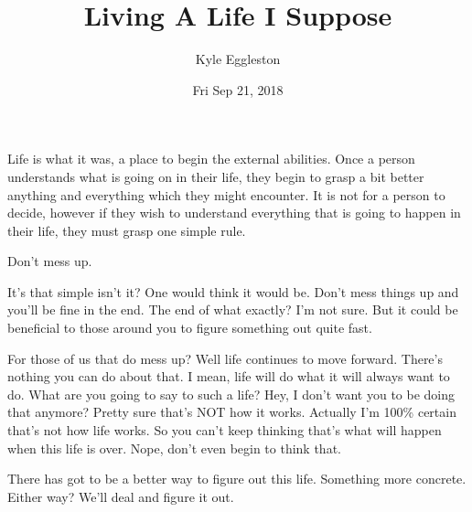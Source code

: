 \documentclass{article}
\title{Living A Life I Suppose}
\author{Kyle Eggleston}
\date{Fri Sep 21, 2018}
\begin{document}
\maketitle

Life is what it was, a place to begin the external abilities. Once a person understands what is going on in their life, they begin to grasp a bit better anything and everything which they might encounter. It is not for a person to decide, however if they wish to understand everything that is going to happen in their life, they must grasp one simple rule.

Don't mess up.

It's that simple isn't it? One would think it would be. Don't mess things up and you'll be fine in the end. The end of what exactly? I'm not sure. But it could be beneficial to those around you to figure something out quite fast.

For those of us that do mess up? Well life continues to move forward. There's nothing you can do about that. I mean, life will do what it will always want to do. What are you going to say to such a life? Hey, I don't want you to be doing that anymore? Pretty sure that's NOT how it works. Actually I'm 100\% certain that's not how life works. So you can't keep thinking that's what will happen when this life is over. Nope, don't even begin to think that.

There has got to be a better way to figure out this life. Something more concrete. Either way? We'll deal and figure it out.
\end{document}
